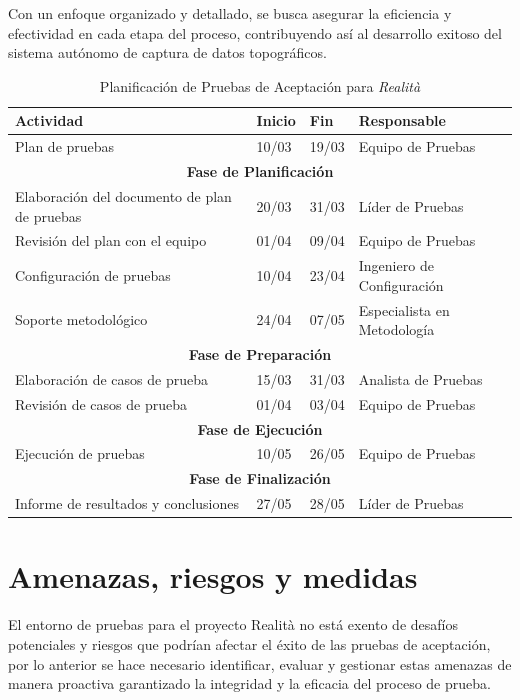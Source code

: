 \documentclass[12pt,a4paper, twoside]{article} %
\begin{document}
Con un enfoque organizado y detallado, se busca asegurar la eficiencia y efectividad en cada etapa del proceso, contribuyendo así al desarrollo exitoso del sistema autónomo de captura de datos topográficos.

\begin{table}[h]
\centering
\begin{tabular}{|l|l|l|l|}
\hline
\textbf{Actividad} & \textbf{Inicio} & \textbf{Fin} & \textbf{Responsable} \\
\hline
Plan de pruebas & 10/03 & 19/03 & Equipo de Pruebas \\
\hline
\multicolumn{4}{|c|}{\textbf{Fase de Planificación}} \\
\hline
Elaboración del documento de plan de pruebas & 20/03 & 31/03 & Líder de Pruebas \\
Revisión del plan con el equipo & 01/04 & 09/04 & Equipo de Pruebas \\
Configuración de pruebas & 10/04 & 23/04 & Ingeniero de Configuración \\
Soporte metodológico & 24/04 & 07/05 & Especialista en Metodología \\
\hline
\multicolumn{4}{|c|}{\textbf{Fase de Preparación}} \\
\hline
Elaboración de casos de prueba & 15/03 & 31/03 & Analista de Pruebas \\
Revisión de casos de prueba & 01/04 & 03/04 & Equipo de Pruebas \\
\hline
\multicolumn{4}{|c|}{\textbf{Fase de Ejecución}} \\
\hline
Ejecución de pruebas & 10/05 & 26/05 & Equipo de Pruebas \\
\hline
\multicolumn{4}{|c|}{\textbf{Fase de Finalización}} \\
\hline
Informe de resultados y conclusiones & 27/05 & 28/05 & Líder de Pruebas \\
\hline
\end{tabular}
\caption{Planificación de Pruebas de Aceptación para \textit{Realità}}
\label{tab:planning}
\end{table}

\section{Amenazas, riesgos y medidas}

El entorno de pruebas para el proyecto Realità no está exento de desafíos potenciales y riesgos que podrían afectar el éxito de las pruebas de aceptación, por lo anterior se hace necesario identificar, evaluar y gestionar estas amenazas de manera proactiva garantizado la integridad y la eficacia del proceso de prueba.
\end{document}
